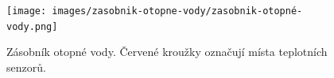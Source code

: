 
\begin{figure}[H]
    \centering
    \texttt{[image: images/zasobnik-otopne-vody/zasobnik-otopné-vody.png]}
    \caption[Zásobník otopné vody.]{Zásobník otopné vody. Červené kroužky označují místa teplotních senzorů.}
    \label{fig:zasobnik-otopné-vody}
\end{figure}